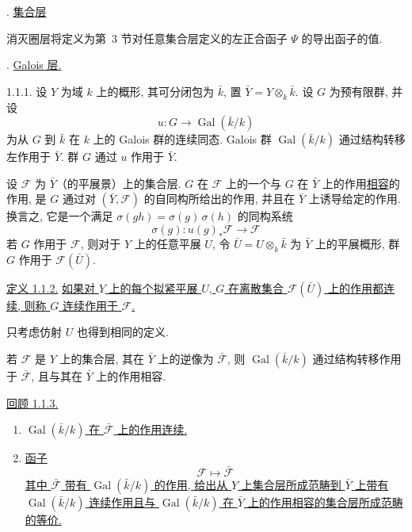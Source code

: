 
. \underline{集合层}

消灭圈层将定义为第~3 节对任意集合层定义的左正合函子 $\Psi$ 的导出函子的值.

. \underline{Galois 层.}

1.1.1. 设 $Y$ 为域 $k$ 上的概形, 其可分闭包为 $\bar{k}$, 置 $\bar{Y}=Y\otimes_k\bar{k}$. 设 $G$ 为预有限群, 并设
\begin{equation*}
u:G\longrightarrow\operatorname{Gal}(\bar{k}/k)
\end{equation*}
为从 $G$ 到 $\bar{k}$ 在 $k$ 上的 Galois 群的连续同态. Galois 群 $\operatorname{Gal}(\bar{k}/k)$ 通过结构转移左作用于 $\bar{Y}$. 群 $G$ 通过 $u$ 作用于 $\bar{Y}$.

设 $\mathcal F$ 为 $\bar Y$（的平展景）上的集合层. $G$ 在 $\mathcal F$ 上的一个与 $G$ 在 $\bar Y$ 上的作用\underline{相容}的作用, 是 $G$ 通过对 $(\bar Y,\mathcal F)$ 的自同构所给出的作用, 并且在 $\bar Y$ 上诱导给定的作用. 换言之, 它是一个满足 $\sigma(gh)=\sigma(g)\,\sigma(h)$ 的同构系统
\begin{equation*}
\sigma(g):u(g)_*\mathcal F\longrightarrow\mathcal F
\end{equation*}
若 $G$ 作用于 $\mathcal F$, 则对于 $Y$ 上的任意平展 $U$, 令 $\bar U=U\otimes_k\bar k$ 为 $\bar Y$ 上的平展概形, 群 $G$ 作用于 $\mathcal F(\bar U)$.

\underline{定义 1.1.2.} \underline{如果对 $Y$ 上的每个拟紧平展 $U$, $G$ 在离散集合 $\mathcal F(\bar U)$ 上的作用都连续, 则称 $G$ 连续作用于 $\mathcal F$.}

只考虑仿射 $U$ 也得到相同的定义.

若 $\mathcal F$ 是 $Y$ 上的集合层, 其在 $\bar Y$ 上的逆像为 $\bar{\mathcal F}$, 则 $\operatorname{Gal}(\bar k/k)$ 通过结构转移作用于 $\bar{\mathcal F}$, 且与其在 $\bar Y$ 上的作用相容.

\underline{回顾 1.1.3.}
\begin{enumerate}[label=(\roman*),leftmargin=2.7em]
\item \underline{$\operatorname{Gal}(\bar k/k)$ 在 $\bar{\mathcal F}$ 上的作用连续.}


\item \underline{函子}
\begin{equation*}
\mathcal F\longmapsto\bar{\mathcal F}
\end{equation*}
\underline{其中 $\bar{\mathcal F}$ 带有 $\operatorname{Gal}(\bar k/k)$ 的作用, 给出从 $Y$ 上集合层所成范畴到 $\bar Y$ 上带有 $\operatorname{Gal}(\bar k/k)$ 连续作用且与 $\operatorname{Gal}(\bar k/k)$ 在 $\bar Y$ 上的作用相容的集合层所成范畴的等价.}
\end{enumerate}

